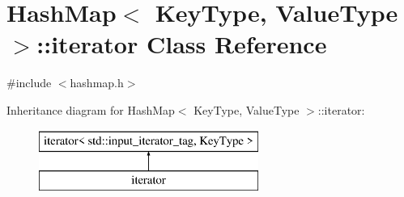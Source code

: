 \hypertarget{classHashMap_1_1iterator}{}\section{Hash\+Map$<$ Key\+Type, Value\+Type $>$\+:\+:iterator Class Reference}
\label{classHashMap_1_1iterator}


{\ttfamily \#include $<$hashmap.\+h$>$}

Inheritance diagram for Hash\+Map$<$ Key\+Type, Value\+Type $>$\+:\+:iterator\+:\begin{figure}[H]
\begin{center}
\leavevmode
\includegraphics[height=2.000000cm]{classHashMap_1_1iterator}
\end{center}
\end{figure}
